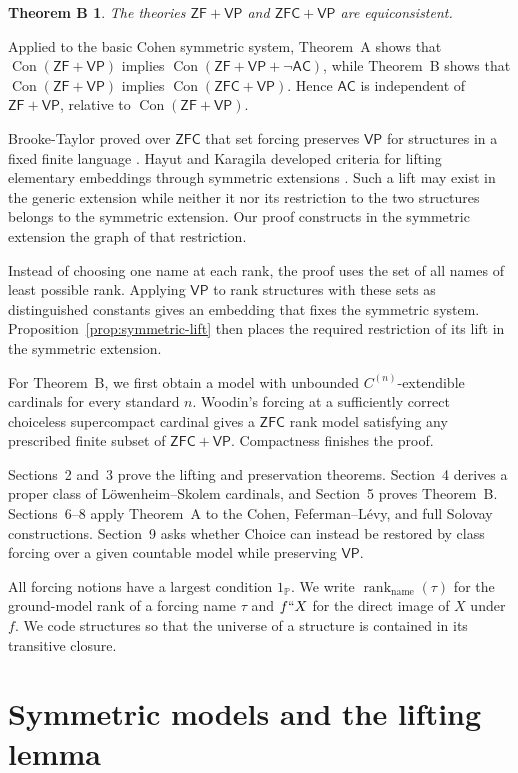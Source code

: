 \documentclass[11pt,a4paper]{amsart}
\newcommand{\VP}{\mathsf{VP}}
\newcommand{\AC}{\mathsf{AC}}
\newcommand{\ZF}{\mathsf{ZF}}
\newcommand{\ZFC}{\mathsf{ZFC}}
\newcommand{\namerank}{\operatorname{rank}_{\mathrm{name}}}
\newcommand{\Con}{\operatorname{Con}}
\theoremstyle{plain}
\newtheorem*{thmB}{Theorem B}
\theoremstyle{definition}
\theoremstyle{remark}
\begin{document}
\begin{thmB}
The theories $\ZF+\VP$ and $\ZFC+\VP$ are equiconsistent.
\end{thmB}

Applied to the basic Cohen symmetric system, Theorem~A shows that $\Con(\ZF+\VP)$ implies $\Con(\ZF+\VP+\neg\AC)$, while Theorem~B shows that $\Con(\ZF+\VP)$ implies $\Con(\ZFC+\VP)$.  Hence $\AC$ is independent of $\ZF+\VP$, relative to $\Con(\ZF+\VP)$.

Brooke-Taylor proved over $\ZFC$ that set forcing preserves $\VP$ for structures in a fixed finite language \cite[Lemma~23 and Theorem~24]{BrookeTaylor}.  Hayut and Karagila developed criteria for lifting elementary embeddings through symmetric extensions \cite[Theorems~4.7 and~4.9]{HayutKaragila}.  Such a lift may exist in the generic extension while neither it nor its restriction to the two structures belongs to the symmetric extension.  Our proof constructs in the symmetric extension the graph of that restriction.

Instead of choosing one name at each rank, the proof uses the set of all names of least possible rank.  Applying $\VP$ to rank structures with these sets as distinguished constants gives an embedding that fixes the symmetric system.  Proposition~\ref{prop:symmetric-lift} then places the required restriction of its lift in the symmetric extension.

For Theorem~B, we first obtain a model with unbounded $C^{(n)}$-extendible cardinals for every standard $n$.  Woodin's forcing at a sufficiently correct choiceless supercompact cardinal gives a $\ZFC$ rank model satisfying any prescribed finite subset of $\ZFC+\VP$.  Compactness finishes the proof.

Sections~2 and~3 prove the lifting and preservation theorems.  Section~4 derives a proper class of L\"owenheim--Skolem cardinals, and Section~5 proves Theorem~B.  Sections~6--8 apply Theorem~A to the Cohen, Feferman--L\'evy, and full Solovay constructions.  Section~9 asks whether Choice can instead be restored by class forcing over a given countable model while preserving $\VP$.

All forcing notions have a largest condition $1_{\mathbb P}$.  We write $\namerank(\tau)$ for the ground-model rank of a forcing name $\tau$ and $f``X$ for the direct image of $X$ under $f$.  We code structures so that the universe of a structure is contained in its transitive closure.

\section{Symmetric models and the lifting lemma}
\end{document}
